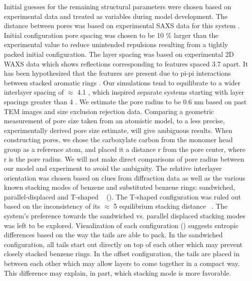 Initial guesses for the remaining structural parameters were chosen
based on experimental data and treated as variables during model
development. The distance between pores was based on experimental SAXS
data for this system \cite{feng_thin_2016}. Initial configuration pore
spacing was chosen to be 10 \% larger than the experimental value to reduce
unintended repulsions resulting from a tightly packed initial configuration. 
The layer spacing was based on experimental 2D WAXS data which shows
reflections corresponding to features spaced 3.7 \angstrom apart. It has 
been hypothesized that the features are present due to pi-pi
interactions between stacked aromatic rings \cite{feng_scalable_2014}. 
Our simulations tend to equilibrate to a wider interlayer spacing of $\approx$ 4.1 \angstrom,
which inspired separate systems starting with layer spacings greater than
 4 \angstrom. We estimate the pore radius to be 0.6 nm based on past TEM 
images and size exclusion rejection data\cite{feng_scalable_2014,
feng_thin_2016,zhou_supported_2005}. Comparing a geometric
measurement of pore size taken from an atomistic model, to a less
precise, experimentally derived pore size estimate, will give ambiguous
results. When constructing pores, we chose the carboxylate carbon from
the monomer head group as a reference atom, and placed it a distance r from the
pore center, where r is the pore radius. We will not make direct comparisons
of pore radius between our model and experiment to avoid the ambiguity. 
The relative interlayer orientation was chosen based on clues from diffraction
data as well as the various known stacking modes of benzene and substituted 
benzene rings: sandwiched, parallel-displaced and T-shaped ~\cite{sinnokrot_estimates_2002}
(). The T-shaped 
configuration was ruled out based on the inconsistency of its $\approx$ 
5 \angstrom equilibrium stacking distance ~\cite{sinnokrot_estimates_2002}. The system's preference
towards the sandwiched vs. parallel displaced stacking modes was left
to be explored. Visualization of each configuration 
() suggests 
entropic differences based on the way the tails are able to pack.
In the sandwiched configuration, all tails start out directly on top 
of each other which may prevent closely stacked benzene rings. In the offset
configuration, the tails are placed in between each other which may allow layers
to come together in a compact way. This difference may explain, in part,
which stacking mode is more favorable.

